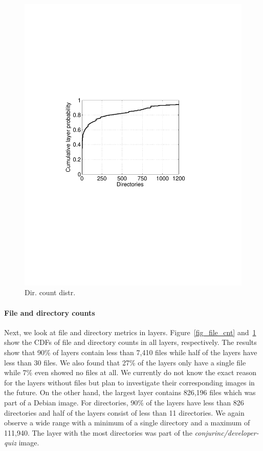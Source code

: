 \begin{figure}
\begin{minipage}{0.23\textwidth}
		\includegraphics[width=1\textwidth]{graphs/dir_cnt.pdf}
		\caption{Dir. count distr.
		}
		\label{fig_dir_cnt}
	\end{minipage}%
\end{figure}
%

\paragraph{File and directory counts}

Next, we look at file and directory metrics in layers.
Figure~\ref{fig_file_cnt} and~\ref{fig_dir_cnt} show the CDFs of file
and directory counts in all layers, respectively.
%
The results show that 90\% of layers contain less than 7,410 files while half
of the layers have less than 30 files.
%
We also found that 27\% of the layers only have a single file while 7\% even showed
no files at all. We currently do not know the exact reason for the layers without files
but plan to investigate their corresponding images in the future.
On the other hand,
the largest layer contains 826,196 files which was part of a Debian image.
%
%
For directories, 90\% of the layers have less than 826 directories and half of the layers consist
of less than 11 directories. We again observe a wide range with a minimum of a single directory
and a maximum of 111,940. The layer with the most directories was part of
the \textit{conjurinc/developer-quiz} image.

